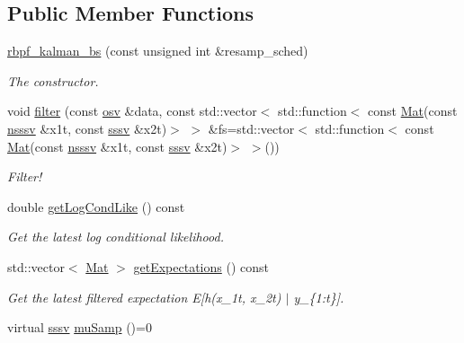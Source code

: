 \subsection*{Public Member Functions}
\begin{DoxyCompactItemize}
\item 
\hyperlink{classrbpf__kalman__bs_a83e8c7899853882f8012321166699de0}{rbpf\+\_\+kalman\+\_\+bs} (const unsigned int \&resamp\+\_\+sched)
\begin{DoxyCompactList}\small\item\em The constructor. \end{DoxyCompactList}\item 
void \hyperlink{classrbpf__kalman__bs_ad60b5c636ab9e894dd8c3781709f0e4c}{filter} (const \hyperlink{classrbpf__kalman__bs_a87690d6ffb54ffb4b76dc2de7fd415d5}{osv} \&data, const std\+::vector$<$ std\+::function$<$ const \hyperlink{classrbpf__kalman__bs_a070b7a6225d1eae7595454fb523fd182}{Mat}(const \hyperlink{classrbpf__kalman__bs_a8ce938ee1e02c5766ad15c1aca4e7796}{nsssv} \&x1t, const \hyperlink{classrbpf__kalman__bs_a803b67ae284377c11e727bb47601045a}{sssv} \&x2t)$>$ $>$ \&fs=std\+::vector$<$ std\+::function$<$ const \hyperlink{classrbpf__kalman__bs_a070b7a6225d1eae7595454fb523fd182}{Mat}(const \hyperlink{classrbpf__kalman__bs_a8ce938ee1e02c5766ad15c1aca4e7796}{nsssv} \&x1t, const \hyperlink{classrbpf__kalman__bs_a803b67ae284377c11e727bb47601045a}{sssv} \&x2t)$>$ $>$())
\begin{DoxyCompactList}\small\item\em Filter! \end{DoxyCompactList}\item 
double \hyperlink{classrbpf__kalman__bs_a8000690df708e71a0f07765594d9f125}{get\+Log\+Cond\+Like} () const 
\begin{DoxyCompactList}\small\item\em Get the latest log conditional likelihood. \end{DoxyCompactList}\item 
std\+::vector$<$ \hyperlink{classrbpf__kalman__bs_a070b7a6225d1eae7595454fb523fd182}{Mat} $>$ \hyperlink{classrbpf__kalman__bs_a2e283936d3e8996574398a68efb4988e}{get\+Expectations} () const 
\begin{DoxyCompactList}\small\item\em Get the latest filtered expectation E\mbox{[}h(x\+\_\+1t, x\+\_\+2t) $\vert$ y\+\_\+\{1\+:t\}\mbox{]}. \end{DoxyCompactList}\item 
virtual \hyperlink{classrbpf__kalman__bs_a803b67ae284377c11e727bb47601045a}{sssv} \hyperlink{classrbpf__kalman__bs_ada4710f03a58c5d461a2141d9dbd49f1}{mu\+Samp} ()=0

\end{DoxyCompactItemize}
